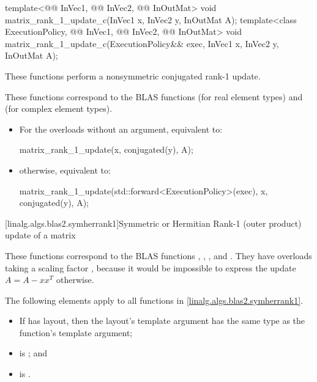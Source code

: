 %
\begin{itemdecl}
template<@@ InVec1, @@ InVec2, @@ InOutMat>
  void matrix_rank_1_update_c(InVec1 x, InVec2 y, InOutMat A);
template<class ExecutionPolicy, @@ InVec1, @@ InVec2, @@ InOutMat>
  void matrix_rank_1_update_c(ExecutionPolicy&& exec, InVec1 x, InVec2 y, InOutMat A);
\end{itemdecl}

\begin{itemdescr}
\pnum
These functions perform a nonsymmetric conjugated rank-1 update.
\begin{note}
These functions correspond to the BLAS functions
 (for real element types) and
 (for complex element types)\supercite{blas2}.
\end{note}

\pnum
\effects
\begin{itemize}
\item
For the overloads without an  argument,
equivalent to:
\begin{codeblock}
matrix_rank_1_update(x, conjugated(y), A);
\end{codeblock}
\item
otherwise, equivalent to:
\begin{codeblock}
matrix_rank_1_update(std::forward<ExecutionPolicy>(exec), x, conjugated(y), A);
\end{codeblock}
\end{itemize}
\end{itemdescr}

[linalg.algs.blas2.symherrank1]{Symmetric or Hermitian Rank-1 (outer product) update of a matrix}

\pnum
\begin{note}
These functions correspond to the BLAS functions
, , , and \supercite{blas2}.
They have overloads taking a scaling factor ,
because it would be impossible to express the update
$A = A - x x^T$ otherwise.
\end{note}

\pnum
The following elements apply to all functions in \ref{linalg.algs.blas2.symherrank1}.

\pnum
\mandates
\begin{itemize}
\item
If  has  layout,
then the layout's  template argument has
the same type as the function's  template argument;
\item
{}
is ; and
\item
{}
is .
\end{itemize}

